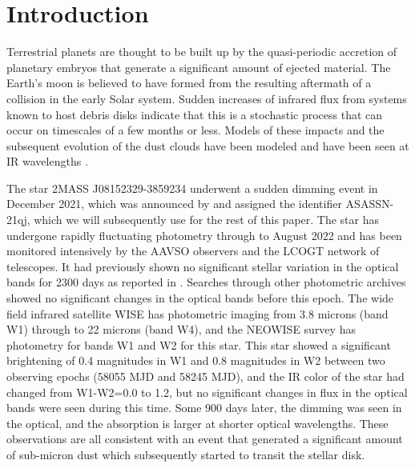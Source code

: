 \documentclass{aa}
\newcommand{\asas}{ASASSN-21qj}
\begin{document}

   \maketitle
%

   \section{Introduction}

Terrestrial planets are thought to be built up by the quasi-periodic accretion of planetary embryos that generate a significant amount of ejected material.
%
The Earth's moon is believed to have formed from the resulting aftermath of a collision in the early Solar system.
%
Sudden increases of infrared flux from systems known to host debris disks indicate that this is a stochastic process that can occur on timescales of a few months or less.
%
Models of these impacts and the subsequent evolution of the dust clouds have been modeled \citep{Jackson12,Jackson14} and have been seen at IR wavelengths \citep{Su19,Su22}.

The star 2MASS J08152329-3859234 underwent a sudden dimming event in December 2021, which was announced by \citet{RizzoSmith21} and assigned the identifier \asas, which we will subsequently use for the rest of this paper.
%
The star has undergone rapidly fluctuating photometry through to August 2022 \citep{RizzoSmith22} and has been monitored intensively by the AAVSO observers and the LCOGT network of telescopes.
%
It had previously shown no significant stellar variation in the optical bands for 2300 days as reported in \citet{RizzoSmith21}.
%
Searches through other photometric archives showed no significant changes in the optical bands before this epoch.
%
The wide field infrared satellite WISE has photometric imaging from 3.8 microns (band W1) through to 22 microns (band W4), and the NEOWISE survey has photometry for bands W1 and W2 for this star.
%
This star showed a significant brightening of 0.4 magnitudes in W1 and 0.8 magnitudes in W2 between two observing epochs (58055 MJD and 58245 MJD), and the IR color of the star had changed from W1-W2=0.0 to 1.2, but no significant changes in flux in the optical bands were seen during this time.
%
Some 900 days later, the dimming was seen in the optical, and the absorption is larger at shorter optical wavelengths.
%
These observations are all consistent with an event that generated a significant amount of sub-micron dust which subsequently started to transit the stellar disk.
\end{document}
